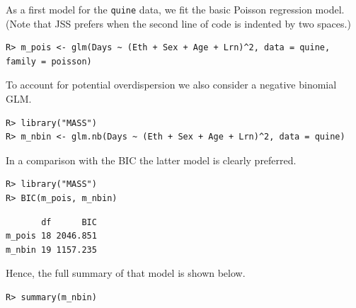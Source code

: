 \documentclass[
  nojss,
  article]{jss}
\begin{document}
As a first model for the \texttt{quine} data, we fit the basic Poisson
regression model. (Note that JSS prefers when the second line of code is
indented by two spaces.)

\begin{verbatim}
R> m_pois <- glm(Days ~ (Eth + Sex + Age + Lrn)^2, data = quine, family = poisson)
\end{verbatim}

To account for potential overdispersion we also consider a negative
binomial GLM.

\begin{verbatim}
R> library("MASS")
R> m_nbin <- glm.nb(Days ~ (Eth + Sex + Age + Lrn)^2, data = quine)
\end{verbatim}

In a comparison with the BIC the latter model is clearly preferred.

\begin{verbatim}
R> library("MASS")
R> BIC(m_pois, m_nbin)
\end{verbatim}

\begin{verbatim}
       df      BIC
m_pois 18 2046.851
m_nbin 19 1157.235
\end{verbatim}

Hence, the full summary of that model is shown below.

\begin{verbatim}
R> summary(m_nbin)
\end{verbatim}
\end{document}

